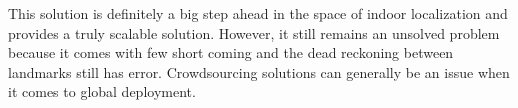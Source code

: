 \documentclass[a4paper]{article}
\begin{document}
This solution is definitely a big step ahead in the space of indoor localization and provides a truly scalable solution. However, it still remains an unsolved problem because it comes with few short coming and the dead reckoning between landmarks still has error. Crowdsourcing solutions can generally be an issue when it comes to global deployment.\\ 








 
\end{document}
